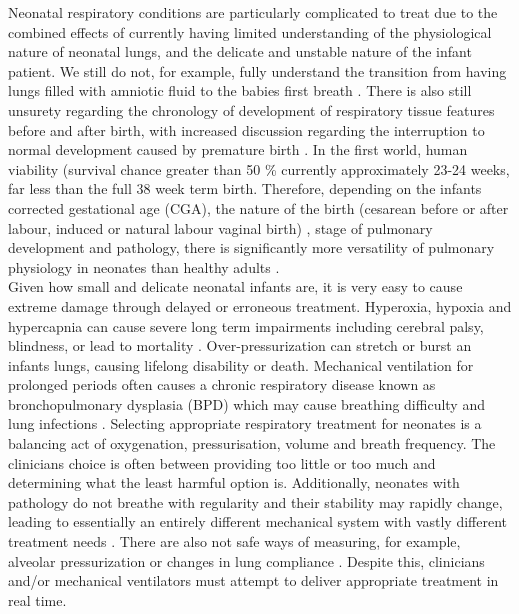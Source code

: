 \documentclass[12pt, openany, oneside]{book}
\begin{document}
Neonatal respiratory conditions are particularly complicated to treat due to the combined effects of currently having limited understanding of the physiological nature of neonatal lungs, and the delicate and unstable nature of the infant patient. We still do not, for example, fully understand the transition from having lungs filled with amniotic fluid to the babies first breath \citep{hooper2013, burri1984fetal}. There is also still unsurety regarding the chronology of development of respiratory tissue features before and after birth, with increased discussion regarding the interruption to normal development caused by premature birth \citep{smith2010normal}. In the first world, human viability (survival chance greater than 50 {\%} currently approximately 23-24 weeks, far less than the full 38 week term birth. Therefore, depending on the infants corrected gestational age (CGA), the nature of the birth (cesarean before or after labour, induced or natural labour vaginal birth) \citep{morrison1995neonatal,jain2006physiology}, stage of pulmonary development and pathology, there is significantly more versatility of pulmonary physiology in neonates than healthy adults \citep{lanteri1993changes}. \\

Given how small and delicate neonatal infants are, it is very easy to cause extreme damage through delayed or erroneous treatment. Hyperoxia, hypoxia and hypercapnia can cause severe long term impairments including cerebral palsy, blindness, or lead to mortality \cite{wall2009neonatal, hankins2003defining}. Over-pressurization can stretch or burst an infants lungs, causing lifelong disability or death. Mechanical ventilation for prolonged periods often causes a chronic respiratory disease known as bronchopulmonary dysplasia (BPD) which may cause breathing difficulty and lung infections \citep{edwards2013}. Selecting appropriate respiratory treatment for neonates is a balancing act of oxygenation, pressurisation, volume and breath frequency. The clinicians choice is often between providing too little or too much and determining what the least harmful option is. Additionally, neonates with pathology do not breathe with regularity and their stability may rapidly change, leading to essentially an entirely different mechanical system with vastly different treatment needs \citep{burri1984fetal, morley2008advances, miedema2011changes, lanteri1993changes}. There are also not safe ways of measuring, for example, alveolar pressurization or changes in lung compliance \citep{morley2008advances}. Despite this, clinicians and/or mechanical ventilators must attempt to deliver appropriate treatment in real time. \\
\end{document}
